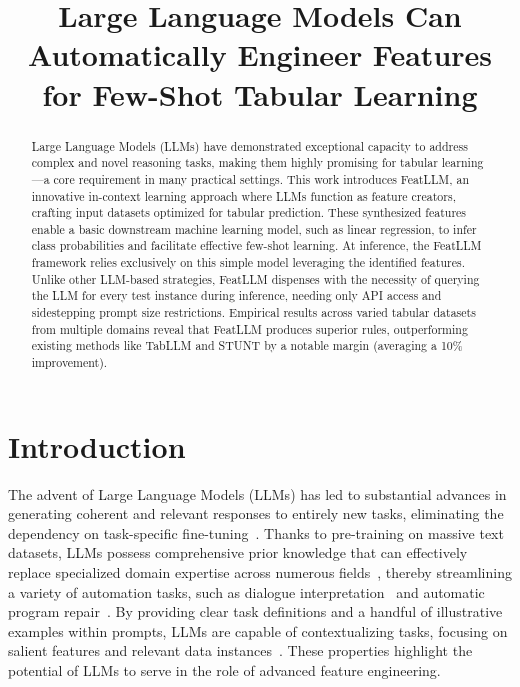 \title{Large Language Models Can Automatically Engineer Features for Few-Shot Tabular Learning}

\begin{abstract}
Large Language Models (LLMs) have demonstrated exceptional capacity to address complex and novel reasoning tasks, making them highly promising for tabular learning—a core requirement in many practical settings. This work introduces \textsf{FeatLLM}, an innovative in-context learning approach where LLMs function as feature creators, crafting input datasets optimized for tabular prediction. These synthesized features enable a basic downstream machine learning model, such as linear regression, to infer class probabilities and facilitate effective few-shot learning. At inference, the \textsf{FeatLLM} framework relies exclusively on this simple model leveraging the identified features. Unlike other LLM-based strategies, \textsf{FeatLLM} dispenses with the necessity of querying the LLM for every test instance during inference, needing only API access and sidestepping prompt size restrictions. Empirical results across varied tabular datasets from multiple domains reveal that \textsf{FeatLLM} produces superior rules, outperforming existing methods like TabLLM and STUNT by a notable margin (averaging a 10\% improvement).
\end{abstract}

\section{Introduction}
The advent of Large Language Models (LLMs) has led to substantial advances in generating coherent and relevant responses to entirely new tasks, eliminating the dependency on task-specific fine-tuning~\cite{creswell2022selection,imani2023mathprompter,taylor2022galactica}. Thanks to pre-training on massive text datasets, LLMs possess comprehensive prior knowledge that can effectively replace specialized domain expertise across numerous fields~\cite{Genomes2021,singhal2023large,wilcox2003role}, thereby streamlining a variety of automation tasks, such as dialogue interpretation~\cite{finch2023leveraging} and automatic program repair~\cite{fan2023automated}. By providing clear task definitions and a handful of illustrative examples within prompts, LLMs are capable of contextualizing tasks, focusing on salient features and relevant data instances~\cite{brown2020language,zhao2023survey}. These properties highlight the potential of LLMs to serve in the role of advanced feature engineering.

